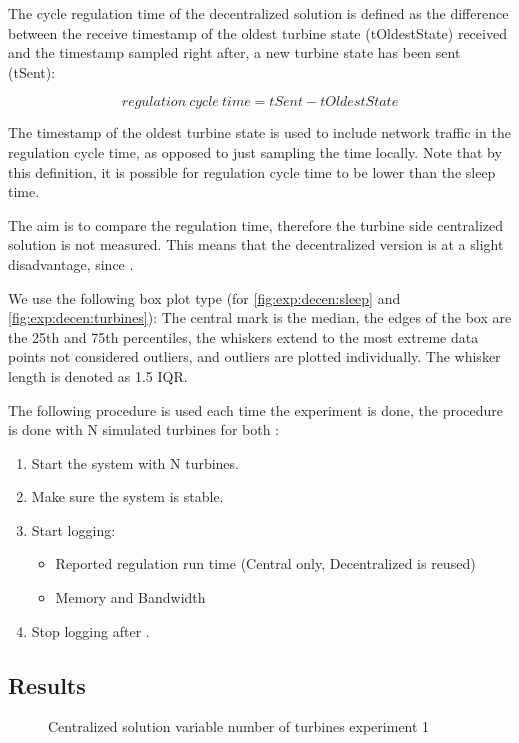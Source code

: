 The cycle regulation time of the decentralized solution is defined as the difference between the receive timestamp of the oldest turbine state (tOldestState) received and the timestamp sampled right after, a new turbine state has been sent (tSent):

$$regulation~cycle~time=tSent-tOldestState$$

The timestamp of the oldest turbine state is used to include network traffic in the regulation cycle time, as opposed to just sampling the time locally. Note that by this definition, it is possible for regulation cycle time to be lower than the sleep time. 

The aim is to compare the regulation time, therefore the turbine side centralized solution is not measured. This means that the decentralized version is at a slight disadvantage, since .

We use the following box plot type (for \cref{fig:exp:decen:sleep} and \cref{fig:exp:decen:turbines}): The central mark is the median, the edges of the box are the 25th and 75th percentiles, the whiskers extend to the most extreme data points not considered outliers, and outliers are plotted individually. The whisker length is denoted as 1.5 IQR. 


The following procedure is used each time the experiment is done, the procedure is done with N simulated turbines for both :

\begin{minipage}{\textwidth}
	\begin{enumerate}
		\item Start the system with N turbines.
		\item Make sure the system is stable.
		\item Start logging:
		\begin{itemize}
			\item Reported regulation run time (Central only, Decentralized is reused)
			\item Memory and Bandwidth
		\end{itemize}
		\item Stop logging after \experiemntRunTime.
		\end{enumerate}
\end{minipage}


\subsection{Results}

\begin{figure}[h!]
	\centering
%	
%	
	
	\caption{Centralized solution variable number of turbines experiment 1}
	\label{fig:exp:cen:turbines}
\end{figure}

